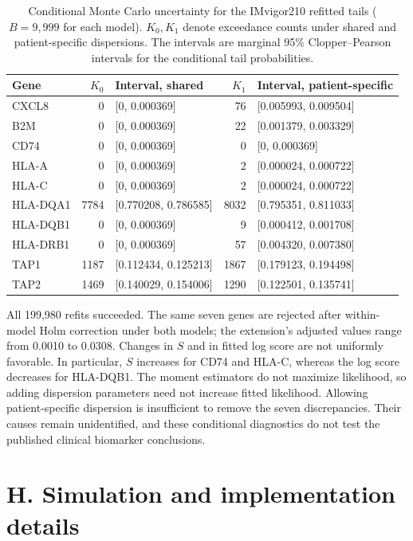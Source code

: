 \documentclass[12pt]{article}
\theoremstyle{remark}
\begin{document}
\begin{table}[htbp]
\centering
\small
\caption{Conditional Monte Carlo uncertainty for the IMvigor210 refitted
tails ($B=9,999$ for each model). $K_0,K_1$ denote exceedance counts under
shared and patient-specific dispersions. The intervals are marginal 95\%
Clopper--Pearson intervals for the conditional tail probabilities.}
\begin{tabular}{lrlrl}
\hline
Gene & $K_0$ & Interval, shared & $K_1$ & Interval, patient-specific\\
\hline
CXCL8    & 0    & [0, 0.000369] & 76   & [0.005993, 0.009504]\\
B2M      & 0    & [0, 0.000369] & 22   & [0.001379, 0.003329]\\
CD74     & 0    & [0, 0.000369] & 0    & [0, 0.000369]\\
HLA-A    & 0    & [0, 0.000369] & 2    & [0.000024, 0.000722]\\
HLA-C    & 0    & [0, 0.000369] & 2    & [0.000024, 0.000722]\\
HLA-DQA1 & 7784 & [0.770208, 0.786585] & 8032 & [0.795351, 0.811033]\\
HLA-DQB1 & 0    & [0, 0.000369] & 9    & [0.000412, 0.001708]\\
HLA-DRB1 & 0    & [0, 0.000369] & 57   & [0.004320, 0.007380]\\
TAP1     & 1187 & [0.112434, 0.125213] & 1867 & [0.179123, 0.194498]\\
TAP2     & 1469 & [0.140029, 0.154006] & 1290 & [0.122501, 0.135741]\\
\hline
\end{tabular}
\end{table}

All 199,980 refits succeeded. The same seven genes are rejected after
within-model Holm correction under both models; the extension's adjusted
values range from 0.0010 to 0.0308. Changes in $S$ and in fitted log score
are not uniformly favorable. In particular, $S$ increases for CD74 and HLA-C,
whereas the log score decreases for HLA-DQB1. The moment estimators do not
maximize likelihood, so adding dispersion parameters need not increase
fitted likelihood. Allowing patient-specific dispersion is insufficient
to remove the seven discrepancies. Their causes remain unidentified, and
these conditional diagnostics do not test the published clinical biomarker
conclusions.

\section*{H. Simulation and implementation details}
\end{document}
